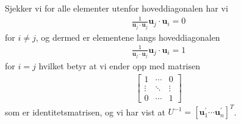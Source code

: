 \documentclass[12pt,
               a4paper,
               article,
               oneside,
               oldfontcommands,
               norsk]{memoir}
\begin{document}
Sjekker vi for alle elementer utenfor hoveddiagonalen har vi
\begin{align*}
\frac{1}{\boldsymbol{u}_j  \cdot \boldsymbol{u}_j} \boldsymbol{u}_j \cdot \boldsymbol{u}_i = 0
\end{align*}
for $i \neq j$, og dermed er elementene langs hoveddiagonalen
\begin{align*}
\frac{1}{\boldsymbol{u}_j  \cdot \boldsymbol{u}_j} \boldsymbol{u}_j \cdot \boldsymbol{u}_i = 1
\end{align*}
for $ i = j$ hvilket betyr at vi ender opp med matrisen
\begin{align*}
\begin{bmatrix}
	1  &\cdots & 	0 \\
	\vdots &\ddots & \vdots \\	
	0 &\cdots & 1
\end{bmatrix}
\end{align*}
som er identitetsmatrisen, og vi har vist at $U^{-1} = \left[\boldsymbol{u}_{1}^{'} \cdots \boldsymbol{u}_{n}^{'}\right]^{T}$.
\end{document}
